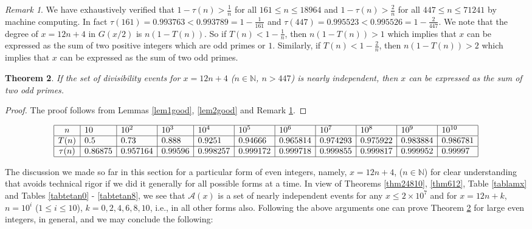 \documentclass[11pt]{article}
\newtheorem{theorem}{Theorem}[section]
\theoremstyle{definition}
\theoremstyle{remark}
\newtheorem{remark}[theorem]{Remark}
\numberwithin{equation}{section}
\newcommand{\Nat}{\mathbb{N}}
\begin{document}
\begin{remark}\label{remgood}
We have exhaustively verified that $1-\tau(n)>\frac{1}{n}$ for all $161\leq n\leq 18964$ and $1-\tau(n)>\frac{2}{n}$ for all $447\leq n\leq 71241$ by machine computing. In fact $\tau(161)=0.993763<0.993789=1-\frac{1}{161}$ and $\tau(447)=0.995523<0.995526=1-\frac{2}{447}$. We note that the degree of $x=12n+4$ in $G(x/2)$ is $n(1-T(n))$. So if $T(n)<1-\frac{1}{n}$, then $n(1-T(n))>1$ which implies that $x$ can be expressed as the sum of two positive integers which are odd primes or $1$. Similarly, if $T(n)<1-\frac{2}{n}$, then $n(1-T(n))>2$ which implies that $x$ can be expressed as the sum of two odd primes. 
\end{remark}

\begin{theorem}\label{tgood}
If the set of divisibility events for $x=12n+4$ {\em ($n\in\Nat$, $n>447$)} is nearly independent, then $x$ can be expressed as the sum of two odd primes.
\end{theorem}

\begin{proof}
The proof follows from Lemmas \ref{lem1good}, \ref{lem2good} and Remark \ref{remgood}.
\end{proof}


\begin{table}[t]
{\footnotesize $$\begin{array}{|c|l|l|l|l|l|l|l|l|l|l|}
\hline
n & 10 & 10^2 & 10^3 & 10^4 & 10^5 & 10^6 & 10^7 & 10^8 & 10^9 & 10^{10}\\
\hline
T(n) & 0.5 & 0.73 & 0.888 & 0.9251 & 0.94666 & 0.965814 & 0.974293 & 0.975922 & 0.983884 & 0.986781\\
\hline
\tau(n) & 0.86875 & 0.957164 & 0.99596 & 0.998257 & 0.999172 & 0.999718 & 0.999855 & 0.999817 & 0.999952 & 0.99997\\
\hline
\end{array}$$}
\caption{Comparison table for $T(n)$ and $\tau(n)$ for $x=12n+4$.}\label{tabtnetafn}
\end{table}

\vspace{1em}
\noindent
The discussion we made so far in this section for a particular form of even integers, namely, $x=12n+4$, ($n\in\Nat$) for clear understanding that avoids technical rigor if we did it generally for all possible forms at a time. In view of Theorems \ref{thm24810}, \ref{thm612}, Table \ref{tablamx} and Tables \ref{tabtetan0} - \ref{tabtetan8}, we see that $\mathscr{A}(x)$ is a set of nearly independent events for any $x\leq 2\times 10^7$ and for $x=12n+k$, $n=10^i$ ($1\leq i\leq 10$), $k=0,2,4,6,8,10$, i.e., in all other forms also. Following the above arguments one can prove Theorem \ref{tgood} for large even integers, in general, and we may conclude the following:
\end{document}
